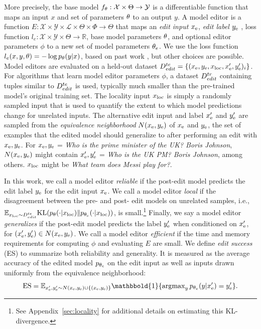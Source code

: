 \documentclass{article}
\begin{document}
More precisely, the base model $f_\theta:\mathcal{X} \times \Theta \rightarrow \mathcal{Y}$ is a differentiable function that maps an input $x$ and set of parameters $\theta$ to an output $y$. A model editor is a function $E : \mathcal{X} \times \mathcal{Y} \times \mathcal{L} \times \Theta \times \Phi \rightarrow \Theta$ that maps an \textit{edit input} $x_\text{e}$, \textit{edit label} $y_\text{e}$ , loss function $l_e:\mathcal{X} \times \mathcal{Y} \times \Theta \rightarrow \mathbb{R}$, base model parameters $\theta$, and optional editor parameters $\phi$ to a new set of model parameters $\theta_e$. We use the loss function $l_e(x,y,\theta) = - \log p_\theta(y|x)$, based on past work \citep{Cao2021EditingFK}, but other choices are possible. Model editors are evaluated on a held-out dataset $D^{te}_{edit} = \{(x_\text{e},y_\text{e},x_\text{loc},x_\text{e}',y_\text{e}')_i\}$. For algorithms that learn model editor parameters $\phi$, a dataset $D^{tr}_{edit}$ containing tuples similar to $D^{te}_{edit}$ is used, typically much smaller than the pre-trained model's original training set. The locality input $x_\text{loc}$ is simply a randomly sampled input that is used to quantify the extent to which model predictions change for unrelated inputs. The alternative edit input and label $x_\text{e}'$ and $y_\text{e}'$ are sampled from the \textit{equivalence neighborhood} $N(x_\text{e},y_\text{e})$ of $x_\text{e}$ and $y_\text{e}$, the set of examples that the edited model should generalize to after performing an edit with $x_\text{e},y_\text{e}$. For $x_\text{e},y_\text{e}$ = \textit{Who is the prime minister of the UK? Boris Johnson}, $N(x_\text{e},y_\text{e})$ might contain $x_\text{e}',y_\text{e}'$ = \textit{Who is the UK PM? Boris Johnson}, among others. $x_\text{loc}$ might be \textit{What team does Messi play for?}.

In this work, we call a model editor \emph{reliable} if the post-edit model predicts the edit label $y_\text{e}$ for the edit input $x_\text{e}$. We call a model editor \emph{local} if the disagreement between the pre- and post- edit models on unrelated samples, i.e., $\mathbb{E}_{x_\text{loc}\sim D^{te}_{edit}}\text{KL}(p_\theta(\cdot | x_\text{loc}) \| p_{\theta_e}(\cdot | x_\text{loc}))$, is small.\footnote{See Appendix~\ref{sec:locality} for additional details on estimating this KL-divergence.} Finally, we say a model editor \emph{generalizes} if the post-edit model predicts the label $y_\text{e}'$ when conditioned on $x_\text{e}'$, for $(x_\text{e}',y_\text{e}')\in N(x_\text{e},y_\text{e})$. We call a model editor \emph{efficient} if the time and memory requirements for computing $\phi$ and evaluating $E$ are small. We define \textit{edit success} (ES) to summarize both reliability and generality. It is measured as the average accuracy of the edited model $p_{\theta_e}$ on the edit input as well as inputs drawn uniformly from the equivalence neighborhood:
\begin{equation}
    \text{ES} = \mathbb{E}_{\xe',\ye' \sim \neighborhood \cup \{(\xe,\ye)\}}\mathbbold{1}\{\argmax\nolimits_yp_{\editedparams}(y|\xe') = \ye'\}.
    \label{eq:edit-success}
\end{equation}
\vspace{-4mm}
\end{document}
